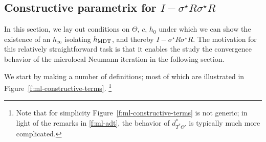 \documentclass[10pt]{article}
\theoremstyle{plain}
\theoremstyle{definition}
\theoremstyle{remark}
\numberwithin{theorem}{section}
\numberwithin{example}{section}
\numberwithin{equation}{section}
\numberwithin{figure}{section}
\newcommand\sref[1]{\textsection\ref{#1}}					%
\newcommand\MDT{\ensuremath{_{\text{\normalfont MDT}}}}	%
\begin{document}
\subsection{Constructive parametrix for $I-\sigma^\star R\sigma^\star R$}						\label{s:ml-construct}

In this section, we lay out conditions on $\Theta$, $c$, $h_0$ under which we can show the existence of an $h_\infty$ isolating $h\MDT$, and thereby $I-\sigma^\star R\sigma^\star R$. The motivation for this relatively straightforward task is that it enables the study the convergence behavior of the microlocal Neumann iteration in the following section.

We start by making a number of definitions; most of which are illustrated in Figure~\ref{f:ml-constructive-terms}.%
\footnote{Note that for simplicity Figure~\ref{f:ml-constructive-terms} is not generic; in light of the remarks in \sref{f:ml-adt}, the behavior of $d^*_{T^*\Theta'}$ is typically much more complicated.}
\end{document}
